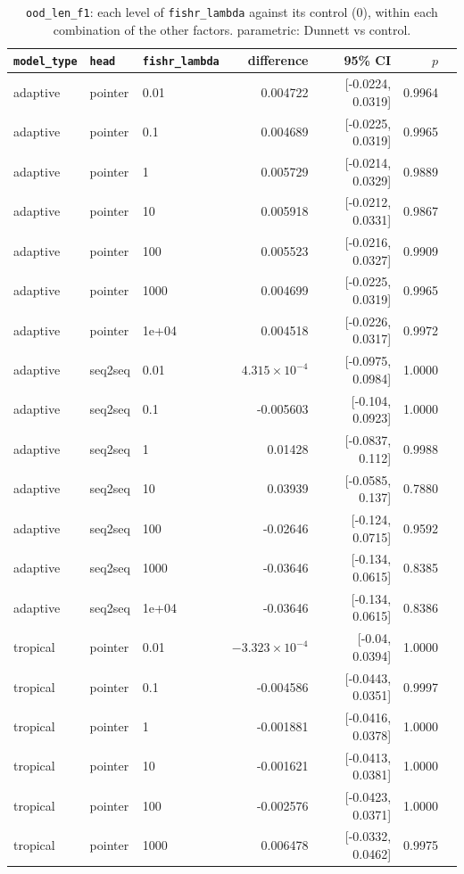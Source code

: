 \documentclass[10pt]{article}
\begin{document}
{\small
\begin{longtable}{lllrrrl}
\caption{\texttt{ood\_len\_f1}: each level of \texttt{fishr\_lambda} against its control (0), within each combination of the other factors. parametric: Dunnett vs control.}\label{tab:control-ood_len_f1}\\
\toprule
\texttt{model\_type} & \texttt{head} & \texttt{fishr\_lambda} & difference & 95\% CI & $p$ & \\
\midrule
\endhead
adaptive & pointer & 0.01 & 0.004722 & [-0.0224, 0.0319] & 0.9964 & \\
adaptive & pointer & 0.1 & 0.004689 & [-0.0225, 0.0319] & 0.9965 & \\
adaptive & pointer & 1 & 0.005729 & [-0.0214, 0.0329] & 0.9889 & \\
adaptive & pointer & 10 & 0.005918 & [-0.0212, 0.0331] & 0.9867 & \\
adaptive & pointer & 100 & 0.005523 & [-0.0216, 0.0327] & 0.9909 & \\
adaptive & pointer & 1000 & 0.004699 & [-0.0225, 0.0319] & 0.9965 & \\
adaptive & pointer & 1e+04 & 0.004518 & [-0.0226, 0.0317] & 0.9972 & \\
adaptive & seq2seq & 0.01 & $4.315\times10^{-4}$ & [-0.0975, 0.0984] & 1.0000 & \\
adaptive & seq2seq & 0.1 & -0.005603 & [-0.104, 0.0923] & 1.0000 & \\
adaptive & seq2seq & 1 & 0.01428 & [-0.0837, 0.112] & 0.9988 & \\
adaptive & seq2seq & 10 & 0.03939 & [-0.0585, 0.137] & 0.7880 & \\
adaptive & seq2seq & 100 & -0.02646 & [-0.124, 0.0715] & 0.9592 & \\
adaptive & seq2seq & 1000 & -0.03646 & [-0.134, 0.0615] & 0.8385 & \\
adaptive & seq2seq & 1e+04 & -0.03646 & [-0.134, 0.0615] & 0.8386 & \\
tropical & pointer & 0.01 & $-3.323\times10^{-4}$ & [-0.04, 0.0394] & 1.0000 & \\
tropical & pointer & 0.1 & -0.004586 & [-0.0443, 0.0351] & 0.9997 & \\
tropical & pointer & 1 & -0.001881 & [-0.0416, 0.0378] & 1.0000 & \\
tropical & pointer & 10 & -0.001621 & [-0.0413, 0.0381] & 1.0000 & \\
tropical & pointer & 100 & -0.002576 & [-0.0423, 0.0371] & 1.0000 & \\
tropical & pointer & 1000 & 0.006478 & [-0.0332, 0.0462] & 0.9975 & \\

\end{longtable}}
\end{document}
